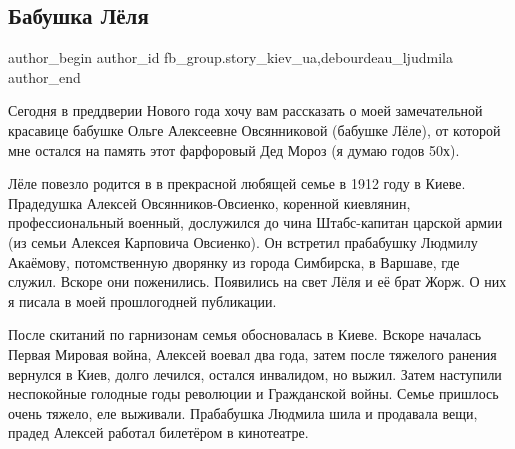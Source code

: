  
 
 
 
 
 
\subsection{Бабушка Лёля}
\label{sec:28_12_2021.fb.fb_group.story_kiev_ua.1.babushka_lelja}
 
\ifcmt
 author_begin
   author_id fb_group.story_kiev_ua,debourdeau_ljudmila
 author_end
\fi

Сегодня в преддверии Нового года хочу вам рассказать о моей замечательной
красавице бабушке Ольге Алексеевне Овсянниковой (бабушке Лёле), от которой мне
остался на память этот фарфоровый Дед Мороз (я думаю годов 50х). 

Лёле повезло родится в в прекрасной любящей семье в 1912 году в Киеве.
Прадедушка Алексей Овсянников-Овсиенко, коренной киевлянин, профессиональный
военный, дослужился до чина Штабс-капитан царской армии (из семьи Алексея
Карповича Овсиенко). Он встретил прабабушку Людмилу Акаёмову, потомственную
дворянку из города Симбирска, в Варшаве, где служил. Вскоре они поженились.
Появились на свет Лёля и её брат Жорж. О них я писала в моей прошлогодней
публикации. 

\raggedcolumns
\begin{multicols}{3} %
\setlength{\parindent}{0pt}


\end{multicols} %

После скитаний по гарнизонам семья обосновалась в Киеве. Вскоре началась Первая
Мировая война, Алексей воевал два года, затем после тяжелого ранения вернулся в
Киев, долго лечился, остался инвалидом, но выжил. Затем наступили неспокойные
голодные годы революции и Гражданской войны. Семье пришлось очень тяжело, еле
выживали. Прабабушка Людмила шила и продавала вещи, прадед Алексей работал
билетёром в кинотеатре.

